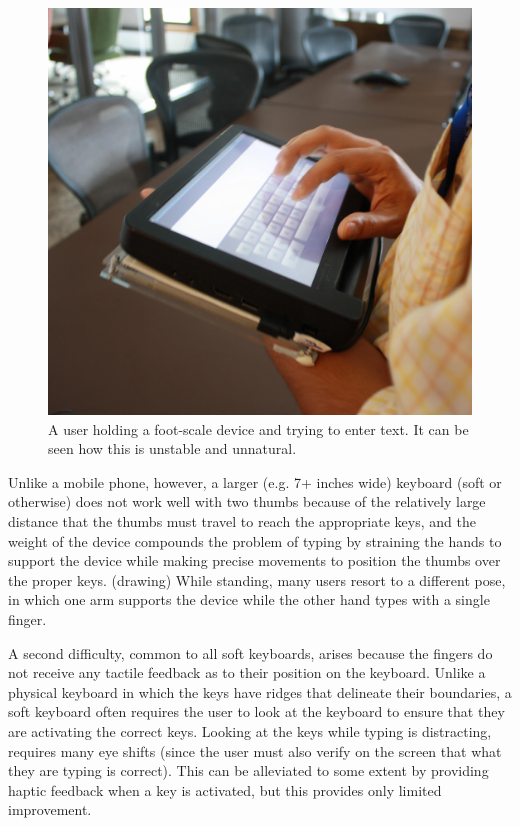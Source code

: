 \begin{figure}
    \includegraphics[scale=0.35]{Figures/device_hold.pdf} 
  	\caption{A user holding a foot-scale device and trying to enter text. It can be seen how this is unstable and unnatural.}
\end{figure}

Unlike a mobile phone, however, a larger (e.g. 7+ inches wide)
keyboard (soft or otherwise) does not work well with two thumbs
because of the relatively large distance that the thumbs must travel
to reach the appropriate keys, and the weight of the device compounds
the problem of typing by straining the hands to support the device
while making precise movements to position the thumbs over the proper
keys. (drawing) While standing, many users resort to a different pose,
in which one arm supports the device while the other hand types with a
single finger.

A second difficulty, common to all soft keyboards, arises because the
fingers do not receive any tactile feedback as to their position on
the keyboard.  Unlike a physical keyboard in which the keys have
ridges that delineate their boundaries, a soft keyboard often requires
the user to look at the keyboard to ensure that they are activating
the correct keys.  Looking at the keys while typing is distracting,
requires many eye shifts (since the user must also verify on the
screen that what they are typing is correct).  This can be alleviated
to some extent by providing haptic feedback when a key is activated,
but this provides only limited improvement.

